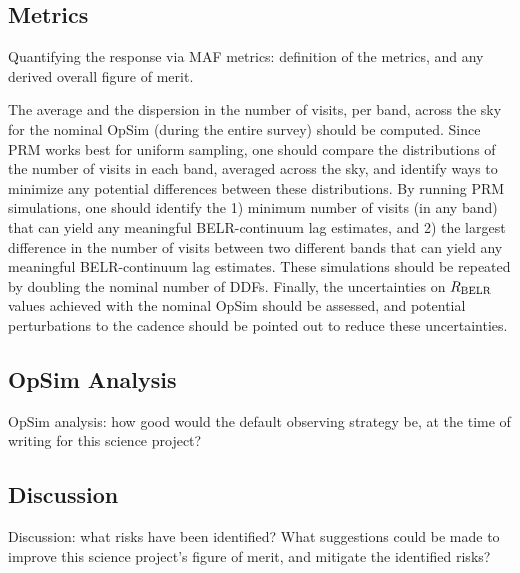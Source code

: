 
\subsection{Metrics}
\label{sec:\secname:metrics}

Quantifying the response via MAF metrics: definition of the metrics,
and any derived overall figure of merit.

The average and the dispersion in the number of visits, per band, across
the sky for the nominal OpSim (during the entire survey) should be computed.
Since PRM works best for uniform sampling, one should compare the distributions
of the number of visits in each band, averaged across the sky, and identify
ways to minimize any potential differences between these distributions. By
running PRM simulations, one should identify the 1) minimum number of visits
(in any band) that can yield any meaningful BELR-continuum lag estimates, and
2) the largest difference in the number of visits between two different bands
that can yield any meaningful BELR-continuum lag estimates. These simulations
should be repeated by doubling the nominal number of DDFs. Finally, the
uncertainties on $R_{\rm BELR}$ values achieved with the nominal OpSim
should be assessed, and potential perturbations to the cadence should be
pointed out to reduce these uncertainties.


\subsection{OpSim Analysis}
\label{sec:\secname:analysis}

OpSim analysis: how good would the default observing strategy be, at
the time of writing for this science project?



\subsection{Discussion}
\label{sec:\secname:discussion}

Discussion: what risks have been identified? What suggestions could be
made to improve this science project's figure of merit, and mitigate
the identified risks?



\navigationbar
